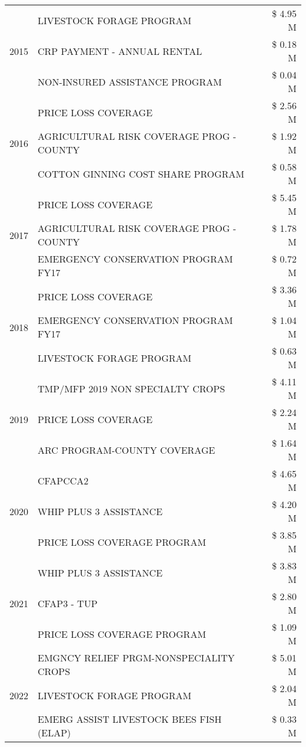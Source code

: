\begin{tabular}{llr}
\cline{1-3}
\multirow[t]{3}{*}{2015} & LIVESTOCK FORAGE PROGRAM & \$ 4.95 M \\
 & CRP PAYMENT - ANNUAL RENTAL & \$ 0.18 M \\
 & NON-INSURED ASSISTANCE PROGRAM & \$ 0.04 M \\
\cline{1-3}
\multirow[t]{3}{*}{2016} & PRICE LOSS COVERAGE & \$ 2.56 M \\
 & AGRICULTURAL RISK COVERAGE PROG - COUNTY & \$ 1.92 M \\
 & COTTON GINNING COST SHARE PROGRAM & \$ 0.58 M \\
\cline{1-3}
\multirow[t]{3}{*}{2017} & PRICE LOSS COVERAGE & \$ 5.45 M \\
 & AGRICULTURAL RISK COVERAGE PROG - COUNTY & \$ 1.78 M \\
 & EMERGENCY CONSERVATION PROGRAM FY17 & \$ 0.72 M \\
\cline{1-3}
\multirow[t]{3}{*}{2018} & PRICE LOSS COVERAGE & \$ 3.36 M \\
 & EMERGENCY CONSERVATION PROGRAM FY17 & \$ 1.04 M \\
 & LIVESTOCK FORAGE PROGRAM & \$ 0.63 M \\
\cline{1-3}
\multirow[t]{3}{*}{2019} & TMP/MFP 2019 NON SPECIALTY CROPS & \$ 4.11 M \\
 & PRICE LOSS COVERAGE & \$ 2.24 M \\
 & ARC PROGRAM-COUNTY COVERAGE & \$ 1.64 M \\
\cline{1-3}
\multirow[t]{3}{*}{2020} & CFAPCCA2 & \$ 4.65 M \\
 & WHIP PLUS 3 ASSISTANCE & \$ 4.20 M \\
 & PRICE LOSS COVERAGE PROGRAM & \$ 3.85 M \\
\cline{1-3}
\multirow[t]{3}{*}{2021} & WHIP PLUS 3 ASSISTANCE & \$ 3.83 M \\
 & CFAP3 - TUP & \$ 2.80 M \\
 & PRICE LOSS COVERAGE PROGRAM & \$ 1.09 M \\
\cline{1-3}
\multirow[t]{3}{*}{2022} & EMGNCY RELIEF PRGM-NONSPECIALITY CROPS & \$ 5.01 M \\
 & LIVESTOCK FORAGE PROGRAM & \$ 2.04 M \\
 & EMERG ASSIST LIVESTOCK BEES FISH (ELAP) & \$ 0.33 M \\
\cline{1-3}
\bottomrule
\end{tabular}
